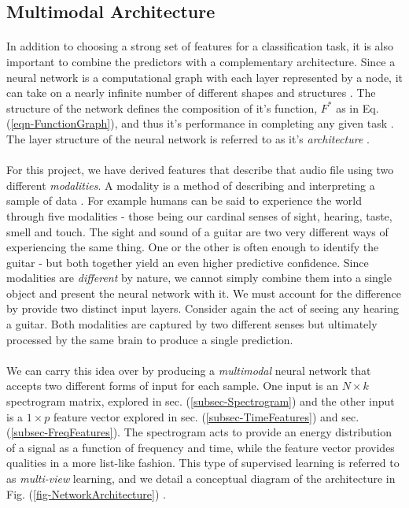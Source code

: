 \documentclass[12pt,letterpaper]{article}
\begin{document}
\subsection{Multimodal Architecture}
\label{subsec-Architecture}

\paragraph*{}In addition to choosing a strong set of features for a classification task, it is also important to combine the predictors with a complementary architecture. Since a neural network is a computational graph with each layer represented by a node, it can take on a nearly infinite number of different shapes and structures \cite{Goodfellow,Virtanen}. The structure of the network defines the composition of it's function, $F^*$ as in Eq.(\ref{eqn-FunctionGraph}), and thus it's performance in completing any given task \cite{Geron}. The layer structure of the neural network is referred to as it's \textit{architecture} \cite{Goodfellow}. 

\paragraph*{}For this project, we have derived features that describe that audio file using two different \textit{modalities}. A modality is a method of describing and interpreting a sample of data \cite{Ngiam}. For example humans can be said to experience the world through five modalities - those being our cardinal senses of sight, hearing, taste, smell and touch. The sight and sound of a guitar are two very different ways of experiencing the same thing. One or the other is often enough to identify the guitar - but both together yield an even higher predictive confidence. Since modalities are \textit{different} by nature, we cannot simply combine them into a single object and present the neural network with it. We must account for the difference by provide two distinct input layers. Consider again the act of seeing any hearing a guitar. Both modalities are captured by two different senses but ultimately processed by the same brain to produce a single prediction.

\paragraph*{}We can carry this idea over by producing a \textit{multimodal} neural network that accepts two different forms of input for each sample. One input is an $N \times k$ spectrogram matrix, explored in sec. (\ref{subsec-Spectrogram}) and the other input is a $1 \times p$ feature vector explored in sec. (\ref{subsec-TimeFeatures}) and sec. (\ref{subsec-FreqFeatures}). The spectrogram acts to provide an energy distribution of a signal as a function of frequency and time, while the feature vector provides qualities in a more list-like fashion. This type of supervised learning is referred to as \textit{multi-view} learning, and we detail a conceptual diagram of the architecture in Fig. (\ref{fig-NetworkArchitecture}) \cite{Li,Ngiam}.
\end{document}
